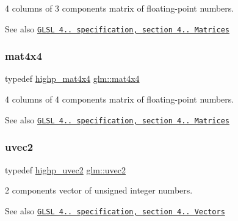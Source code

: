 4 columns of 3 components matrix of floating-\/point numbers.

\begin{DoxySeeAlso}{See also}
\href{http://www.opengl.org/registry/doc/GLSLangSpec.4.20.8.pdf}{\tt G\+L\+SL 4.. specification, section 4.. Matrices} 
\end{DoxySeeAlso}
\mbox{\label{group__core__types_ga63e3ee9447ed593484140a9368e738ec}} 
\subsubsection{\texorpdfstring{mat4x4}{mat4x4}}
{\footnotesize\ttfamily typedef \hyperlink{group__core__precision_ga93c7db376e7b0bd24ef4947667468c9a}{highp\+\_\+mat4x4} \hyperlink{group__core__types_ga63e3ee9447ed593484140a9368e738ec}{glm\+::mat4x4}}

4 columns of 4 components matrix of floating-\/point numbers.

\begin{DoxySeeAlso}{See also}
\href{http://www.opengl.org/registry/doc/GLSLangSpec.4.20.8.pdf}{\tt G\+L\+SL 4.. specification, section 4.. Matrices} 
\end{DoxySeeAlso}
\mbox{\label{group__core__types_gafd2041b45eff671aa8899d2c2835eee9}} 
\subsubsection{\texorpdfstring{uvec2}{uvec2}}
{\footnotesize\ttfamily typedef \hyperlink{group__core__precision_ga34aca1cdf2130b1179fd7c5554bc1883}{highp\+\_\+uvec2} \hyperlink{group__core__types_gafd2041b45eff671aa8899d2c2835eee9}{glm\+::uvec2}}

2 components vector of unsigned integer numbers.

\begin{DoxySeeAlso}{See also}
\href{http://www.opengl.org/registry/doc/GLSLangSpec.4.20.8.pdf}{\tt G\+L\+SL 4.. specification, section 4.. Vectors} 
\end{DoxySeeAlso}
\mbox{\label{group__core__types_gac4ba593917841b859ba1683b8b52b8fa}} 
